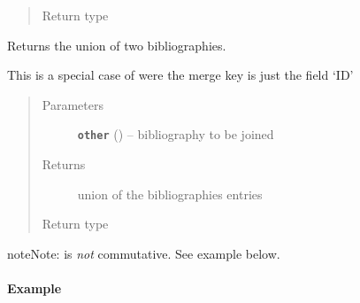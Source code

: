 \documentclass[letterpaper,10pt,english]{sphinxmanual}
\begin{document}
\begin{fulllineitems}
\begin{fulllineitems}
\begin{quote}
\begin{description}
\item[{Return type}] \leavevmode
{\hyperref[modules/pybibtools:listb.pybibtools.Bibliography]{}}

\end{description}\end{quote}

\end{fulllineitems}


\begin{fulllineitems}
\label{modules/pybibtools:listb.pybibtools.Bibliography.union}
Returns the union of two bibliographies.

This is a special case of {\hyperref[modules/pybibtools:listb.pybibtools.Bibliography.merge]{}} were the merge key is just
the field `ID'
\begin{quote}\begin{description}
\item[{Parameters}] \leavevmode
\textbf{\texttt{other}} ({\hyperref[modules/pybibtools:listb.pybibtools.Bibliography]{}}) -- bibliography to be joined

\item[{Returns}] \leavevmode
union of the bibliographies entries

\item[{Return type}] \leavevmode
{\hyperref[modules/pybibtools:listb.pybibtools.Bibliography]{}}

\end{description}\end{quote}

\begin{notice}{note}{Note:}
 is \emph{not} commutative. See example below.
\end{notice}
\paragraph{Example}


\end{fulllineitems}
\end{fulllineitems}
\end{document}
